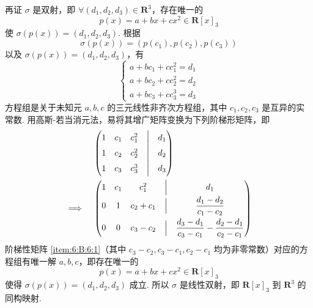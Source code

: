 \begin{enumerate}
          再证 $ \sigma $ 是双射，即 $ \forall (d_1, d_2, d_3) \in \mathbf{R}^3 $，存在唯一的
          \[ p(x) = a + bx + cx^2 \in \mathbf{R}[x]_3 \]
          使 $ \sigma(p(x)) = (d_1, d_2, d_3) $. 根据
          \[ \sigma(p(x)) = (p(c_1), p(c_2), p(c_3)) \]
          以及 $ \sigma(p(x)) = (d_1, d_2, d_3) $，有
          \[ \begin{cases}
                  a + bc_1 + cc_1^2 = d_1 \\
                  a + bc_2 + cc_2^2 = d_2 \\
                  a + bc_3 + cc_3^3 = d_3
              \end{cases} \]
          方程组是关于未知元 $ a, b, c $ 的三元线性非齐次方程组，其中 $ c_1, c_2, c_3 $ 是互异的实常数. 用高斯-若当消元法，易将其增广矩阵变换为下列阶梯形矩阵，即
          \begin{align} %
                             & \begin{pmatrix}
                                   1 & c_1 & c_1^2 & \Bigm| & d_1 \\
                                   1 & c_2 & c_2^2 & \Bigm| & d_2 \\
                                   1 & c_3 & c_3^3 & \Bigm| & d_3
                               \end{pmatrix} \notag                                                                    \\
              \implies \quad & \begin{pmatrix}
                                   1 & c_1 & c_1^2     & \Bigm| & d_1                                                         \\[1ex]
                                   0 & 1   & c_2 + c_1 & \Bigm| & \dfrac{d_1 - d_2}{c_1 - c_2}                                \\[2ex]
                                   0 & 0   & c_3 - c_2 & \Bigm| & \dfrac{d_3 - d_1}{c_3 - c_1} - \dfrac{d_2 - d_1}{c_2 - c_1}
                               \end{pmatrix} \label{item:6:B:6:1}
          \end{align}
          阶梯性矩阵 \ref*{item:6:B:6:1}（其中 $ c_3 - c_2, c_3 - c_1, c_2 - c_1 $ 均为非零常数）对应的方程组有唯一解 $ a, b, c $，即存在唯一的
          \[ p(x) = a + bx + cx^2 \in \mathbf{R}[x]_3 \]
          使得 $ \sigma(p(x)) = (d_1, d_2, d_3) $ 成立. 所以 $ \sigma $ 是线性双射，即 $ \mathbf{R}[x]_3 $ 到 $ \mathbf{R}^3 $ 的同构映射.
\end{enumerate}

